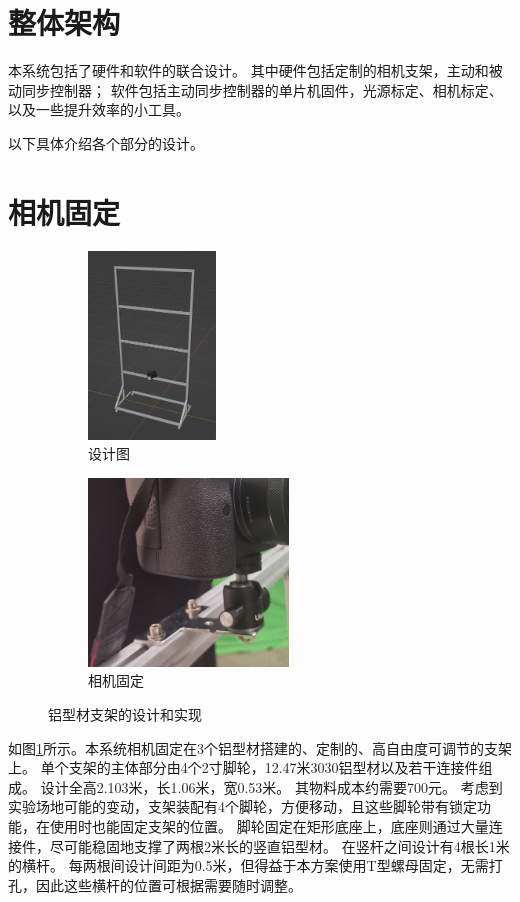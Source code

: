 \documentclass{ctexart}
\begin{document}
\section{整体架构}

本系统包括了硬件和软件的联合设计。
其中硬件包括定制的相机支架，主动和被动同步控制器；
软件包括主动同步控制器的单片机固件，光源标定、相机标定、以及一些提升效率的小工具。

以下具体介绍各个部分的设计。

\section{相机固定}

\begin{figure}
\centering
\begin{subfigure}[b]{0.3\textwidth}
    \centering
    \includegraphics[height=5cm]{figures/frame-design}
    \caption{设计图}
\end{subfigure}%
\begin{subfigure}[b]{0.47\textwidth}
    \centering
    \includegraphics[height=5cm]{figures/frame-camera}
    \caption{相机固定}
\end{subfigure}
\caption{铝型材支架的设计和实现}
\label{fig:frame}
\end{figure}
如图\ref{fig:frame}所示。本系统相机固定在3个铝型材搭建的、定制的、高自由度可调节的支架上。
单个支架的主体部分由4个2寸脚轮，12.47米3030铝型材以及若干连接件组成。
设计全高2.103米，长1.06米，宽0.53米。
其物料成本约需要700元。
考虑到实验场地可能的变动，支架装配有4个脚轮，方便移动，且这些脚轮带有锁定功能，在使用时也能固定支架的位置。
脚轮固定在矩形底座上，底座则通过大量连接件，尽可能稳固地支撑了两根2米长的竖直铝型材。
在竖杆之间设计有4根长1米的横杆。
每两根间设计间距为0.5米，但得益于本方案使用T型螺母固定，无需打孔，因此这些横杆的位置可根据需要随时调整。
\end{document}
